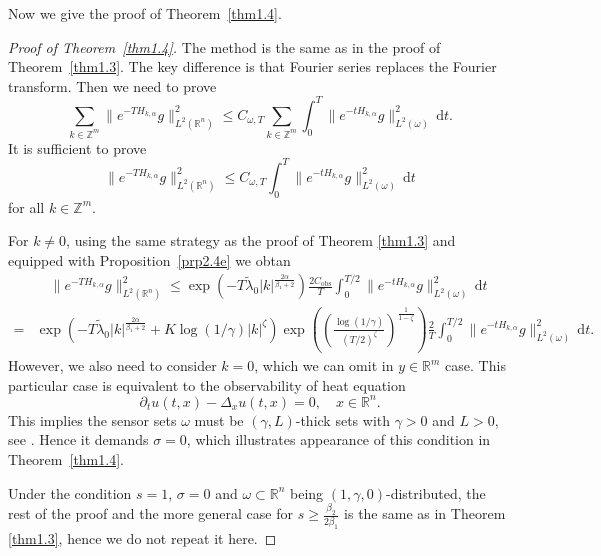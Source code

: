 \documentclass{article}
\numberwithin{equation}{section}
\renewcommand{\d}{\,\mathrm{d}}
\newcommand\R{\ensuremath{\mathbb{R}}}
\newcommand\Z{\ensuremath{\mathbb{Z}}}
\numberwithin{equation}{section}
\theoremstyle{definition}
\begin{document}
Now we give the proof of Theorem~\ref{thm1.4}. 

\begin{proof}[Proof of Theorem~\ref{thm1.4}]
	The method is the same as in the proof of Theorem~\ref{thm1.3}. The key difference is that Fourier series replaces the Fourier transform. Then we need to prove
\begin{equation}
	\sum_{ k \in \Z^{m}} \|e^{-TH_{k,\alpha}}g\|^2_{L^2(\R^{n})}\le C_{\omega,T} \sum_{k \in \Z^{m}} \int_0^{T}\|e^{-tH_{k,\alpha}}g\|^2_{L^2(\omega)}\d t.
\end{equation}
It is sufficient to prove 
\begin{equation}
	\|e^{-TH_{k,\alpha}}g\|^2_{L^2(\R^{n})}\le C_{\omega,T}\int_0^{T}\|e^{-tH_{k,\alpha}}g\|^2_{L^2(\omega)}\d t
\end{equation}
for all $k \in \Z^{m}$. 

For $k\neq 0$, using the same strategy as the proof of Theorem \ref{thm1.3} and equipped with Proposition~\ref{prp2.4e} we obtan
\begin{equation}
	\begin{aligned}
		&\quad \|e^{-TH_{k,\alpha}}g\|^2_{L^2(\R^{n})}\le \exp\left(-T \widetilde{\lambda}_0|k|^{\frac{2\alpha}{\beta_1+2}}\right)  \frac{2C_{\mathrm{obs}}}{T}\int_0^{T /2} \|e^{-tH_{k,\alpha}}g\|^2_{L^2(\omega)}\d t\\
		=& \exp\left( - T \widetilde{\lambda}_0 |k|^{\frac{2\alpha}{\beta_1+2}} +K\log(1 /\gamma) |k|^{\zeta}\right)\exp\left( \left(\frac{\log(1 /\gamma)}{(T /2)^{\zeta}}\right)^{\frac{1}{1-\zeta}} \right)\frac{2}{T} \int_0^{T /2} \|e^{-tH_{k,\alpha}}g\|^2_{L^2(\omega)}\d t.   
	\end{aligned} 
\end{equation}
However, we also need to consider $k=0$, which we can omit in  $y \in \R^{m}$ case. This particular case is equivalent to the observability of heat equation 
\begin{equation}
	\partial_t u(t,x)-\Delta_x u(t,x)=0, \quad x \in \R^{n}. 
\end{equation}
This implies the sensor sets $\omega$ must be $(\gamma,L)$-thick sets with $\gamma>0$ and $L>0$, see \cite[Theorem~1.1]{wang2019observable}. Hence it demands $\sigma=0$, which illustrates appearance of this condition in Theorem~\ref{thm1.4}.
	
Under the condition $s=1$, $\sigma =0$ and $\omega\subset \R^{n}$ being $(1,\gamma,0)$-distributed, the rest of the proof and the more general case for $s\ge \frac{\beta_2}{2\beta_1}$ is the same as in Theorem \ref{thm1.3}, hence we do not repeat it here.
\end{proof}
\end{document}
